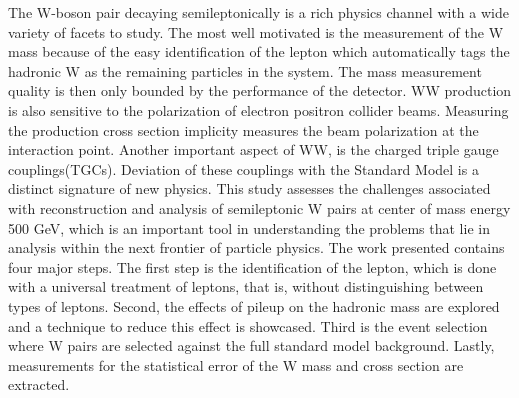 The W-boson pair decaying semileptonically is a rich physics channel with a wide variety of facets to study. The most well motivated is the measurement of the W mass because of the easy identification of the lepton which automatically tags the hadronic W as the remaining particles in the system. The mass measurement quality is then only bounded by the performance of the detector. WW production is also sensitive to the polarization of electron positron collider beams.  Measuring the production cross section implicity measures the beam polarization at the interaction point. Another important aspect of WW, is the charged triple gauge couplings(TGCs). Deviation of these couplings with the Standard Model is a distinct signature of new physics. This study assesses the challenges associated with reconstruction and analysis of semileptonic W pairs at center of mass energy 500 GeV, which is an important tool in understanding the problems that lie in analysis within the next frontier of particle physics. The work presented contains four major steps. The first step is the identification of the lepton, which is done with a universal treatment of leptons, that is, without distinguishing between types of leptons.  Second, the effects of pileup on the hadronic mass are explored and a technique to reduce this effect is showcased. Third is the event selection where W pairs are selected against the full standard model background. Lastly, measurements for the statistical error of the W mass and cross section are extracted.